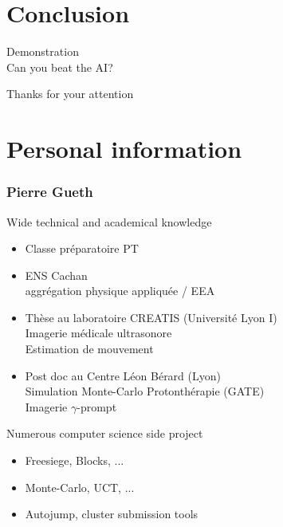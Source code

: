 \documentclass{beamer}
\begin{document}
\section{Conclusion}

\begin{frame}
\begin{center}
\Huge Demonstration \\ Can you beat the AI?
\end{center}
\end{frame}

\begin{frame}
\begin{center}
\Huge Thanks for your attention
\end{center}
\end{frame}

\section{Personal information}

\begin{frame}
\frametitle{Pierre Gueth}
\begin{block}{Wide technical and academical knowledge}
\begin{itemize}
\item Classe préparatoire PT
\item ENS Cachan \\ aggrégation physique appliquée / EEA
\item Thèse au laboratoire CREATIS (Université Lyon I) \\ Imagerie médicale ultrasonore \\ Estimation de mouvement
\item Post doc au Centre Léon Bérard (Lyon) \\ Simulation Monte-Carlo Protonthérapie (GATE) \\ Imagerie $\gamma$-prompt
\end{itemize}
\end{block}
\begin{block}{Numerous computer science side project}
\begin{itemize}
\item Freesiege, Blocks, ...
\item Monte-Carlo, UCT, ...
\item Autojump, cluster submission tools
\end{itemize}
\end{block}
\end{frame}
\end{document}
